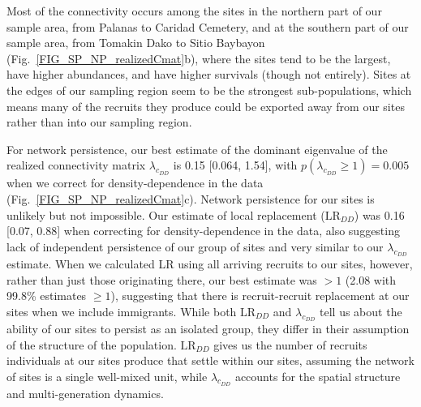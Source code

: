 \documentclass[12pt, oneside]{article}   	%
\begin{document}
Most of the connectivity occurs among the sites in the northern part of our sample area, from Palanas to Caridad Cemetery, and at the southern part of our sample area, from Tomakin Dako to Sitio Baybayon (Fig.\ \ref{FIG_SP_NP_realizedCmat}b), where the sites tend to be the largest, have higher abundances, and have higher survivals (though not entirely). Sites at the edges of our sampling region seem to be the strongest sub-populations, which means many of the recruits they produce could be exported away from our sites rather than into our sampling region. %

For network persistence, our best estimate of the dominant eigenvalue of the realized connectivity matrix $\lambda_{c_{DD}}$ is 0.15 [0.064, 1.54], with $p(\lambda_{c_{DD}} \geq 1) = 0.005$ when we correct for density-dependence in the data (Fig.\ \ref{FIG_SP_NP_realizedCmat}c). Network persistence for our sites is unlikely but not impossible. Our estimate of local replacement ($\text{LR}_{DD}$) was 0.16 [0.07, 0.88] when correcting for density-dependence in the data, also suggesting lack of independent persistence of our group of sites and very similar to our $\lambda_{c_{DD}}$ estimate. When we calculated LR using all arriving recruits to our sites, however, rather than just those originating there, our best estimate was $> 1$ (2.08 with 99.8\% estimates $\geq 1$), suggesting that there is recruit-recruit replacement at our sites when we include immigrants. While both $\text{LR}_{DD}$ and $\lambda_{c_{DD}}$ tell us about the ability of our sites to persist as an isolated group, they differ in their assumption of the structure of the population. $\text{LR}_{DD}$ gives us the number of recruits individuals at our sites produce that settle within our sites, assuming the network of sites is a single well-mixed unit, while $\lambda_{c_{DD}}$ accounts for the spatial structure and multi-generation dynamics. %

\end{document}
